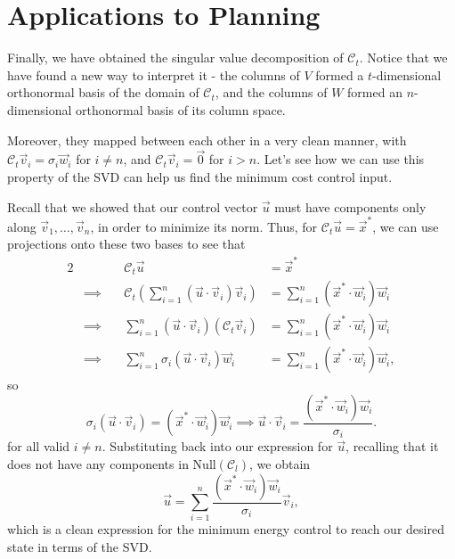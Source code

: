 \documentclass[letterpaper]{article}
\theoremstyle{remark}
\newcommand{\Null}[1]{\text{Null}(#1)}
\newcommand{\eqn}[1]{\begin{alignat*}{2}#1\end{alignat*}}
\newcommand*{\thus}{&\implies\quad&}
\begin{document}
\section{Applications to Planning}
Finally, we have obtained the singular value decomposition of $\mathscr{C}_t$. Notice that we have found a new way to interpret it - the columns of $V$ formed a $t$-dimensional orthonormal basis of the domain of $\mathscr{C}_t$, and the columns of $W$ formed an $n$-dimensional orthonormal basis of its column space.

Moreover, they mapped between each other in a very clean manner, with $\mathscr{C}_t\vec{v}_i = \sigma_i\vec{w}_i$ for $i \ne n$, and $\mathscr{C}_t\vec{v}_i = \vec{0}$ for $i > n$. Let's see how we can use this property of the SVD can help us find the minimum cost control input.

Recall that we showed that our control vector $\vec{u}$ must have components only along $\vec{v}_1, \ldots, \vec{v}_n$, in order to minimize its norm. Thus, for $\mathscr{C}_t\vec{u} = \vec{x}^*$, we can use projections onto these two bases to see that
\eqn{
    && \mathscr{C}_t\vec{u} &= \vec{x}^* \\
    \thus \mathscr{C}_t \left(\sum_{i=1}^n (\vec{u} \cdot \vec{v}_i) \vec{v}_i\right) &= \sum_{i=1}^n (\vec{x}^* \cdot \vec{w}_i)\vec{w}_i \\
    \thus \sum_{i=1}^n (\vec{u} \cdot \vec{v}_i) (\mathscr{C}_t\vec{v}_i) &= \sum_{i=1}^n (\vec{x}^* \cdot \vec{w}_i)\vec{w}_i \\
    \thus \sum_{i=1}^n \sigma_i(\vec{u} \cdot \vec{v}_i) \vec{w}_i &= \sum_{i=1}^n (\vec{x}^* \cdot \vec{w}_i)\vec{w}_i,
}
so
\[
    \sigma_i(\vec{u} \cdot \vec{v}_i) = (\vec{x}^* \cdot \vec{w}_i)\vec{w}_i \implies \vec{u} \cdot \vec{v}_i = \frac{(\vec{x}^* \cdot \vec{w}_i)\vec{w}_i}{\sigma_i}.
\]
for all valid $i \ne n$. Substituting back into our expression for $\vec{u}$, recalling that it does not have any components in $\Null{\mathscr{C}_l}$, we obtain
\[
    \vec{u} = \sum_{i=1}^n \frac{(\vec{x}^* \cdot \vec{w}_i)\vec{w}_i}{\sigma_i} \vec{v}_i,
\]
which is a clean expression for the minimum energy control to reach our desired state in terms of the SVD.
\end{document}
